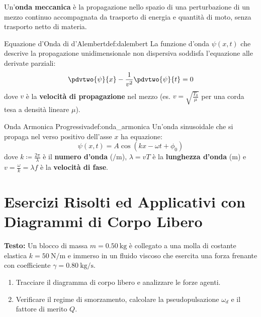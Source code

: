 Un'\textbf{onda meccanica} è la propagazione nello spazio di una perturbazione di un mezzo continuo accompagnata da trasporto di energia e quantità di moto, senza trasporto netto di materia.

\begin{definizione}{Equazione d'Onda di d'Alembert}{def:dalembert}
La funzione d'onda $\psi(x, t)$ che descrive la propagazione unidimensionale non dispersiva soddisfa l'equazione alle derivate parziali:
\begin{equation}
    \pdvtwo{\psi}{x} - \frac{1}{v^2}\pdvtwo{\psi}{t} = 0
    \label{eq:dalembert}
\end{equation}
dove $v$ è la \textbf{velocità di propagazione} nel mezzo (es. $v = \sqrt{\frac{T_0}{\mu}}$ per una corda tesa a densità lineare $\mu$).
\end{definizione}

\begin{definizione}{Onda Armonica Progressiva}{def:onda_armonica}
Un'onda sinusoidale che si propaga nel verso positivo dell'asse $x$ ha equazione:
\begin{equation}
    \psi(x, t) = A \cos(kx - \omega t + \phi_0)
    \label{eq:onda_armonica}
\end{equation}
dove $k \coloneqq \frac{2\pi}{\lambda}$ è il \textbf{numero d'onda} ($\si{\per\metre}$), $\lambda = v T$ è la \textbf{lunghezza d'onda} ($\si{\metre}$) e $v = \frac{\omega}{k} = \lambda f$ è la \textbf{velocità di fase}.
\end{definizione}

\section{Esercizi Risolti ed Applicativi con Diagrammi di Corpo Libero}
\label{sec:esercizi_oscillazioni}

\begin{esercizio}
\textbf{Testo:}
Un blocco di massa $m = \SI{0.50}{\kilogram}$ è collegato a una molla di costante elastica $k = \SI{50}{\newton\per\metre}$ e immerso in un fluido viscoso che esercita una forza frenante con coefficiente $\gamma = \SI{0.80}{\kilogram\per\second}$.
\begin{enumerate}
    \item Tracciare il diagramma di corpo libero e analizzare le forze agenti.
    \item Verificare il regime di smorzamento, calcolare la pseudopulsazione $\omega_d$ e il fattore di merito $Q$.
\end{enumerate}
\end{esercizio}

